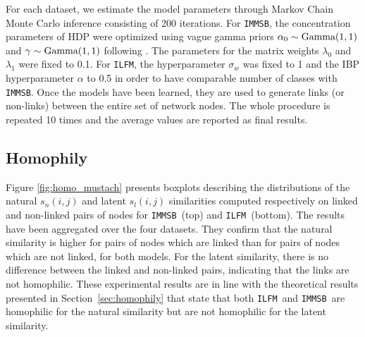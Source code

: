 \documentclass[conference]{IEEEtran}
\renewcommand{\text}{\textnormal}
\newcommand{\ifm}{\texttt{ILFM}}
\newcommand{\imb}{\texttt{IMMSB}}
\begin{document}
For each dataset, we estimate the model parameters through Markov Chain Monte Carlo inference consisting of 200 iterations. For \imb, the concentration parameters of HDP were optimized  using vague gamma priors $\alpha_0 \sim \text{Gamma}(1,1)$ and $\gamma \sim \text{Gamma}(1,1)$ following \cite{HDP}. The parameters for the matrix weights  $\lambda_0$ and $\lambda_1$ were fixed to 0.1. For \ifm, the hyperparameter  $\sigma_w$ was fixed to 1 and the IBP hyperparameter $\alpha$ to 0.5 in order to  have comparable number of classes with \imb. Once the models have been learned, they are used to generate links (or non-links) between the entire set of network nodes. The whole procedure is repeated 10 times and the average values are reported as final results.

\subsection{Homophily}

Figure \ref{fig:homo_mustach} presents boxplots describing the distributions of the natural $s_n(i,j)$ and latent $s_l(i,j)$ similarities computed respectively on linked and non-linked pairs of nodes for \imb\ (top) and \ifm\ (bottom). The results have been aggregated over the four datasets. They confirm that the natural similarity is  higher for pairs of nodes which are linked than for pairs of nodes which are not linked, for both models. For the latent similarity,  there is no difference between the linked and non-linked pairs, indicating that the links are not homophilic. These experimental results are in line with the theoretical results presented in Section~\ref{sec:homophily} that state that both \ifm\ and \imb\ are homophilic for  the natural similarity but are not homophilic for the latent similarity.
\end{document}
